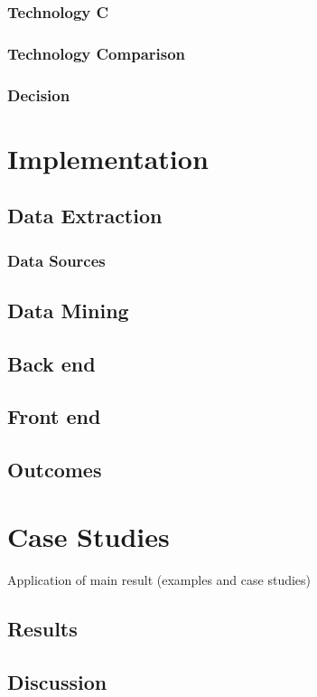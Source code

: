 \documentclass[
  oneside,
  11pt, a4paper,
  footinclude=true,
  headinclude=true,
  cleardoublepage=empty
]{scrbook}
\begin{document}
	\subsection{Technology C}
	\subsection{Technology Comparison}
	\subsection{Decision}
	
	
	\chapter{Implementation}
	\section{Data Extraction}
	\subsection{Data Sources} %
	\section{Data Mining}
	\section{Back end}
	\section{Front end}
	\section{Outcomes}


	\chapter{Case Studies}
	Application of main result (examples and case studies)
    	\section{Results}
    	\section{Discussion}
\end{document}
